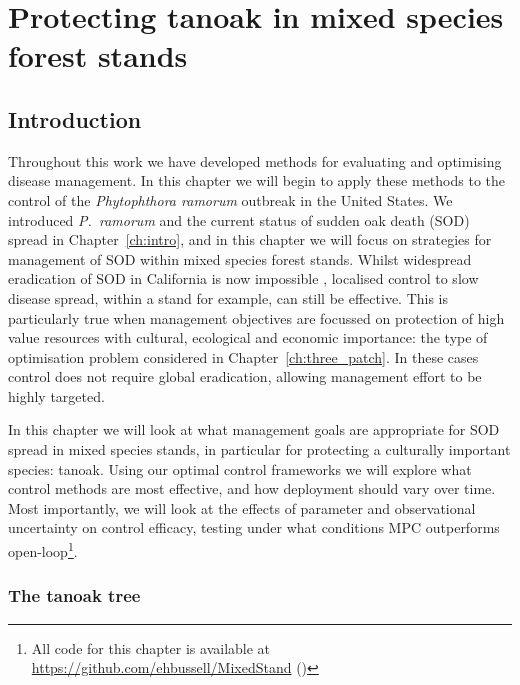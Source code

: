 %
\chapter{Protecting tanoak in mixed species forest stands\label{ch:protect_tanoak}}

\section{Introduction\label{sec:ch5:Intro}}

Throughout this work we have developed methods for evaluating and optimising disease management. In this chapter we will begin to apply these methods to the control of the \textit{Phytophthora ramorum} outbreak in the United States. We introduced \textit{P.~ramorum} and the current status of sudden oak death (SOD) spread in Chapter~\ref{ch:intro}, and in this chapter we will focus on strategies for management of SOD within mixed species forest stands. Whilst widespread eradication of SOD in California is now impossible \citep{cunniffe_modelling_2016}, localised control to slow disease spread, within a stand for example, can still be effective. This is particularly true when management objectives are focussed on protection of high value resources with cultural, ecological and economic importance: the type of optimisation problem considered in Chapter~\ref{ch:three_patch}. In these cases control does not require global eradication, allowing management effort to be highly targeted.

In this chapter we will look at what management goals are appropriate for SOD spread in mixed species stands, in particular for protecting a culturally important species: tanoak. Using our optimal control frameworks we will explore what control methods are most effective, and how deployment should vary over time. Most importantly, we will look at the effects of parameter and observational uncertainty on control efficacy, testing under what conditions MPC outperforms open-loop\footnote{All code for this chapter is available at \url{https://github.com/ehbussell/MixedStand} ()}.

\subsection{The tanoak tree}

